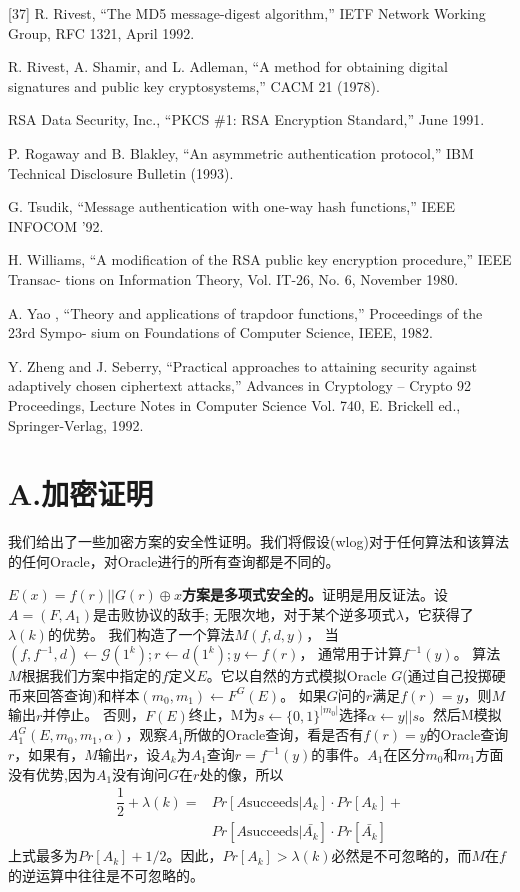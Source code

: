 \documentclass[]{article}
\begin{document}
    [37] R. Rivest, “The MD5 message-digest algorithm,” IETF Network Working Group, RFC 1321,
    April 1992.\par
    [38] R. Rivest, A. Shamir, and L. Adleman, “A method for obtaining digital signatures and
    public key cryptosystems,” CACM 21 (1978).\par
    [39] RSA Data Security, Inc., “PKCS \#1: RSA Encryption Standard,” June 1991.\par
    [40] P. Rogaway and B. Blakley, “An asymmetric authentication protocol,” IBM Technical
    Disclosure Bulletin (1993).\par
    [41] G. Tsudik, “Message authentication with one-way hash functions,” IEEE INFOCOM ’92.\par
    [42] H. Williams, “A modification of the RSA public key encryption procedure,” IEEE Transac-
    tions on Information Theory, Vol. IT-26, No. 6, November 1980.\par
    [43] A. Yao , “Theory and applications of trapdoor functions,” Proceedings of the 23rd Sympo-
    sium on Foundations of Computer Science, IEEE, 1982.\par
    [44] Y. Zheng and J. Seberry, “Practical approaches to attaining security against adaptively
    chosen ciphertext attacks,” Advances in Cryptology – Crypto 92 Proceedings, Lecture Notes
    in Computer Science Vol. 740, E. Brickell ed., Springer-Verlag, 1992.\par
    
    \section*{A.加密证明}
    我们给出了一些加密方案的安全性证明。我们将假设(wlog)对于任何算法和该算法的任何Oracle，对Oracle进行的所有查询都是不同的。
    \par
    
    \textbf{$E(x)=f(r)||G(r)\oplus x$方案是多项式安全的。}证明是用反证法。设$A = (F, A_1)$是击败协议的敌手;
    无限次地，对于某个逆多项式$\lambda$，它获得了$\lambda(k)$的优势。
    我们构造了一个算法$M(f,d,y)$，
    当$(f,f^{-1},d)\leftarrow \mathcal{G}(1^k);r\leftarrow d(1^k);y\leftarrow f(r)$，
    通常用于计算$f^{-1}(y)$。
    算法$M$根据我们方案中指定的$f$定义$E$。它以自然的方式模拟Oracle $G$(通过自己投掷硬币来回答查询)和样本$(m_0,m_1)\leftarrow F^G(E)$。
    如果$G$问的$r$满足$f(r) = y$，则$M$输出$r$并停止。
    否则，$F(E)$终止，M为$s\leftarrow \{0,1\}^{|m_0|}$选择$\alpha \leftarrow y || s$。然后M模拟$A_1^G(E,m_0,m_1,\alpha)$，观察$A_1$所做的Oracle查询，看是否有$f(r)=y$的Oracle查询$r$，如果有，$M$输出$r$，设$A_k$为$A_1$查询$r = f^{-1}(y)$的事件。$A_1$在区分$m_0$和$m_1$方面没有优势,因为$A_1$没有询问$G$在$r$处的像，所以
    \begin{align*}
    	\dfrac{1}{2}+\lambda (k)= &Pr[A \text{succeeds} |A_k]\cdot Pr[A_k]+\\
    	                          &Pr[A \text{succeeds} |\bar{A_k}]\cdot Pr[\bar{A_k}]
    \end{align*}
    上式最多为$Pr[A_k]+1/2$。因此，$Pr[A_k]>\lambda (k)$必然是不可忽略的，而$M$在$f$的逆运算中往往是不可忽略的。
    \par
    
\end{document}
